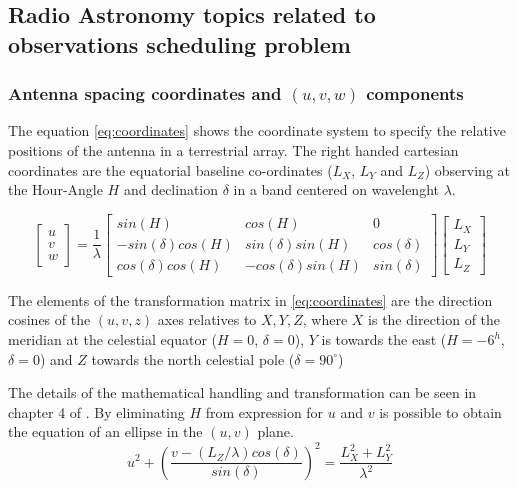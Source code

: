 \documentclass[11pt]{article}
\begin{document}
\subsection{Radio Astronomy topics related to observations scheduling problem}
\label{sec:astro-concepts}
\subsubsection{Antenna spacing coordinates and $(u,v,w)$ components}
\label{sec:uvcover}
The equation \ref{eq:coordinates} shows the coordinate system to specify the relative positions of the antenna in a terrestrial array. The right handed cartesian coordinates are the equatorial baseline co-ordinates ($L_X$, $L_Y$ and $L_Z$) observing at the Hour-Angle $H$ and declination $\delta$ in a band centered on wavelenght $\lambda$. 

\begin{equation}\label{eq:coordinates}
\begin{bmatrix}
u\\
v\\
w
\end{bmatrix}
=\frac{1}{\lambda}
\begin{bmatrix}
sin(H) & cos(H) & 0\\
-sin(\delta)cos(H) & sin(\delta)sin(H) & cos(\delta)\\
cos(\delta)cos(H) & -cos(\delta)sin(H) & sin(\delta)
\end{bmatrix}
\begin{bmatrix}
L_{X}\\
L_{Y}\\
L_{Z}
\end{bmatrix}
\end{equation}

The elements of the transformation matrix in \ref{eq:coordinates} are the direction cosines of the $(u,v,z)$ axes relatives to $X, Y, Z$, where $X$ is the direction of the meridian at the celestial equator ($H=0$, $\delta=0$), $Y$ is towards the east ($H=-6^h$, $\delta=0$) and $Z$ towards the north celestial pole ($\delta=90^{\circ}$)

The details of the mathematical handling and transformation can be seen in chapter 4 of \cite{thompson01}. By eliminating $H$ from expression for $u$ and $v$ is possible to obtain the equation of an ellipse in the $(u,v)$ plane.
\begin{equation}
u^2 + \left(
\frac{v-(L_Z/\lambda)cos(\delta)}{sin(\delta)}\right)^2
=
\frac{L_X^2 + L_Y^2}{\lambda^2}
\end{equation}
\end{document}
